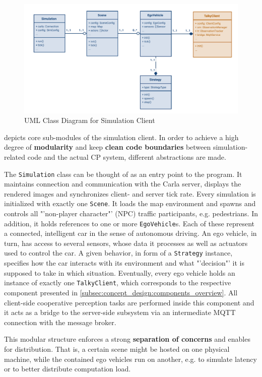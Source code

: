 \begin{figure}
	\centering
	\includegraphics[width=0.9\linewidth]{98_images/client_classes}
	\caption{UML Class Diagram for Simulation Client}
	\label{fig:client_classes}
\end{figure}

 depicts core sub-modules of the simulation client. In order to achieve a high degree of \textbf{modularity} and keep \textbf{clean code boundaries} between simulation-related code and the actual CP system, different abstractions are made.

The \texttt{Simulation} class can be thought of as an entry point to the program. It maintains connection and communication with the Carla server, displays the rendered images and synchronizes client- and server tick rate. Every simulation is initialized with exactly one \texttt{Scene}. It loads the map environment and spawns and controls all "'non-player character"' (NPC) traffic participants, e.g. pedestrians. In addition, it holds references to one or more \texttt{EgoVehicle}s. Each of these represent a connected, intelligent car in the sense of autonomous driving. An ego vehicle, in turn, has access to several sensors, whose data it processes as well as actuators used to control the car. A given behavior, in form of a \texttt{Strategy} instance, specifies how the car interacts with its environment and what "'decision"' it is supposed to take in which situation. Eventually, every ego vehicle holds an instance of exactly one \texttt{TalkyClient}, which corresponds to the respective component presented in \cref{subsec:concept_design:components_overview}. All client-side cooperative perception tasks are performed inside this component and it acts as a bridge to the server-side subsystem via an intermediate MQTT connection with the message broker.

This modular structure enforces a strong \textbf{separation of concerns} and enables for distribution. That is, a certain scene might be hosted on one physical machine, while the contained ego vehicles run on another, e.g. to simulate latency or to better distribute computation load.

